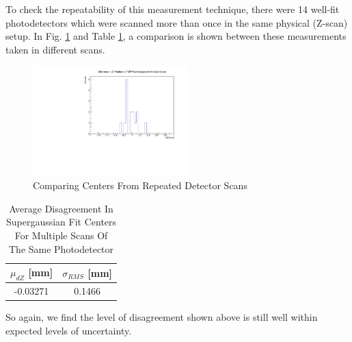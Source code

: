 
To check the repeatability of this measurement technique, there were 14 well-fit photodetectors which were scanned more than once in the same physical (Z-scan) setup. In  Fig. \ref{fig:repzmeas} and Table \ref{tab:mulitscandz}, a comparison is shown between these measurements taken in different scans.
\begin{figure}[H]
    \centering
    \includegraphics[width=6cm]{graphics/repdzbnostats.pdf}
    \caption{Comparing Centers From Repeated Detector Scans}
    \label{fig:repzmeas}
\end{figure}
\begin{table}[H]
    \centering
    \begin{tabular}{c|c}
        $\mu_{dZ}$ [mm]& $\sigma_{RMS}$ [mm]  \\
        \hline
        -0.03271 & 0.1466
    \end{tabular}
    \caption{Average Disagreement In Supergaussian Fit Centers For Multiple Scans Of The Same Photodetector}
    \label{tab:mulitscandz}
\end{table}
\noindent 
So again, we find the level of disagreement shown above is still well within expected levels of uncertainty.


